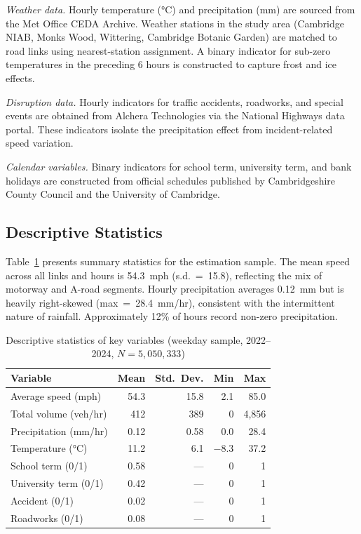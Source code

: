 \documentclass[review,authoryear]{elsarticle}
\begin{document}
\textit{Weather data.} Hourly temperature (\si{\degreeCelsius}) and precipitation (\si{mm}) are sourced from the Met Office CEDA Archive. Weather stations in the study area (Cambridge NIAB, Monks Wood, Wittering, Cambridge Botanic Garden) are matched to road links using nearest-station assignment. A binary indicator for sub-zero temperatures in the preceding 6 hours is constructed to capture frost and ice effects.

\textit{Disruption data.} Hourly indicators for traffic accidents, roadworks, and special events are obtained from Alchera Technologies via the National Highways data portal. These indicators isolate the precipitation effect from incident-related speed variation.

\textit{Calendar variables.} Binary indicators for school term, university term, and bank holidays are constructed from official schedules published by Cambridgeshire County Council and the University of Cambridge.

\subsection{Descriptive Statistics}
\label{sec:data:desc}

Table~\ref{tab:desc} presents summary statistics for the estimation sample. The mean speed across all links and hours is 54.3~\si{mph} (s.d.~=~15.8), reflecting the mix of motorway and A-road segments. Hourly precipitation averages 0.12~\si{mm} but is heavily right-skewed (max~=~28.4~\si{mm/hr}), consistent with the intermittent nature of rainfall. Approximately 12\% of hours record non-zero precipitation.

\begin{table}[H]
\centering
\caption{Descriptive statistics of key variables (weekday sample, 2022--2024, $N = 5{,}050{,}333$)}
\label{tab:desc}
\begin{tabular}{lrrrr}
\toprule
Variable & Mean & Std.\ Dev. & Min & Max \\
\midrule
Average speed (\si{mph}) & 54.3 & 15.8 & 2.1 & 85.0 \\
Total volume (veh/hr) & 412 & 389 & 0 & 4{,}856 \\
Precipitation (\si{mm/hr}) & 0.12 & 0.58 & 0.0 & 28.4 \\
Temperature (\si{\degreeCelsius}) & 11.2 & 6.1 & $-$8.3 & 37.2 \\
School term (0/1) & 0.58 & --- & 0 & 1 \\
University term (0/1) & 0.42 & --- & 0 & 1 \\
Accident (0/1) & 0.02 & --- & 0 & 1 \\
Roadworks (0/1) & 0.08 & --- & 0 & 1 \\
\bottomrule
\end{tabular}
\end{table}
\end{document}
